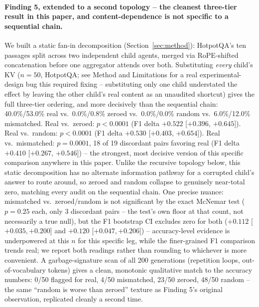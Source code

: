 \documentclass[11pt]{article}
\begin{document}
\paragraph{Finding 5, extended to a second topology -- the cleanest
three-tier result in this paper, and content-dependence is not specific
to a sequential chain.} We built a static fan-in decomposition
(Section~\ref{sec:method}): HotpotQA's ten passages split across two
independent child agents, merged via RoPE-shifted concatenation before
one aggregator attends over both. Substituting \emph{every} child's KV
($n=50$, HotpotQA; see Method and Limitations for a real
experimental-design bug this required fixing -- substituting only one
child understated the effect by leaving the other child's real content
as an unaudited shortcut) gives the full three-tier ordering, and more
decisively than the sequential chain: 40.0\%/53.0\% real vs.\ 0.0\%/0.8\%
zeroed vs.\ 0.0\%/0.0\% random vs.\ 6.0\%/12.0\% mismatched. Real vs.\
zeroed: $p<0.0001$ (F1 delta $+0.522$ [$+0.396$, $+0.645$]). Real vs.\
random: $p<0.0001$ (F1 delta $+0.530$ [$+0.403$, $+0.654$]). Real vs.\
mismatched: $p=0.0001$, 18 of 19 discordant pairs favoring real (F1
delta $+0.410$ [$+0.267$, $+0.546$]) -- the strongest, most decisive
version of this specific comparison anywhere in this paper. Unlike the
recursive topology below, this static decomposition has no alternate
information pathway for a corrupted child's answer to route around, so
zeroed and random collapse to genuinely near-total zero, matching every
audit on the sequential chain. One precise nuance: mismatched vs.\
zeroed/random is not significant by the exact McNemar test ($p=0.25$
each, only 3 discordant pairs -- the test's own floor at that count, not
necessarily a true null), but the F1 bootstrap CI excludes zero for both
($+0.112$ [$+0.035,+0.200$] and $+0.120$ [$+0.047,+0.206$]) --
accuracy-level evidence is underpowered at this $n$ for this specific
leg, while the finer-grained F1 comparison trends real; we report both
readings rather than rounding to whichever is more convenient. A
garbage-signature scan of all 200 generations (repetition loops,
out-of-vocabulary tokens) gives a clean, monotonic qualitative match to
the accuracy numbers: 0/50 flagged for real, 4/50 mismatched, 23/50
zeroed, 48/50 random -- the same ``random is worse than zeroed'' texture
as Finding 5's original observation, replicated cleanly a second time.
\end{document}

